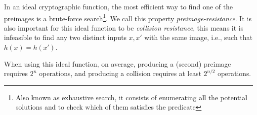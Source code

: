 In an ideal cryptographic function, the most efficient way to find one of the
  preimages is a brute-force search\footnote{Also known as exhaustive search,
  it consists of enumerating all the potential solutions and to check which of
  them satisfies the predicate}. We call this property
  \textit{preimage-resistance}.
It is also important for this ideal function to be \textit{collision
  resistance}, this means it is infeasible to find any two distinct inputs
  $x, x'$ with the same image, i.e., such that $h(x) = h(x')$.

When using this ideal function, on average, producing a (second) preimage
  requires $2^n$ operations, and producing a collision requires at least
  $2^{n / 2} $ operations\cite{preneel1993analysis}.
